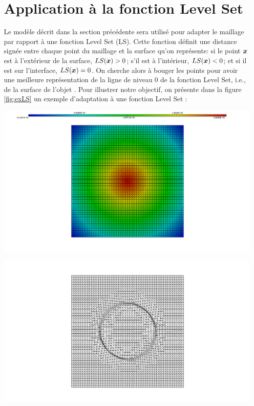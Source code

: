 \section{Application à la fonction Level Set}


\label{sec:application}

\indent Le modèle décrit dans la section précédente sera utilisé pour adapter le maillage par rapport à une fonction Level Set (LS). Cette fonction définit une distance signée entre chaque point du maillage et la surface qu'on représente: si le point \(\boldsymbol{x}\) est à l'extérieur de la surface, \(LS(\boldsymbol{x}) > 0\); s'il est à l'intérieur, \(LS(\boldsymbol{x}) < 0\); et si il est sur l'interface, \(LS(\boldsymbol{x}) = 0\).  On cherche alors à bouger les points pour avoir une meilleure représentation de la ligne de niveau 0 de la fonction Level Set, i.e., de la surface de l'objet \cite{ducrot}. Pour illustrer notre objectif, on présente dans la figure \ref{fig:exLS} un exemple d'adaptation à une fonction Level Set :

\begingroup
	\begin{minipage}[t]{.5\linewidth}
		\centering
		\includegraphics[clip=true, trim = 10cm 0 10cm 0, scale=.25]{Bordeaux/figures/LSinit.png}
	\end{minipage}
	\hfill
	\begin{minipage}[t]{.5\linewidth}
		\centering
		\includegraphics[clip=true, trim = 10cm 0 10cm 0, scale=.25]{Bordeaux/figures/LSadapt.png}
	\end{minipage}
\endgroup

